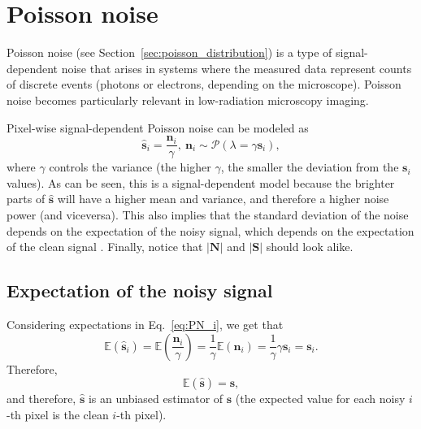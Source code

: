 
\section{Poisson noise}

Poisson noise (see Section~\ref{sec:poisson_distribution}) is a type
of signal-dependent noise that arises in systems where the measured
data represent counts of discrete events (photons or electrons,
depending on the microscope). Poisson noise becomes particularly
relevant in low-radiation microscopy imaging.

Pixel-wise signal-dependent Poisson noise can be modeled as
\begin{equation}
  \hat{\mathbf{s}}_i = \frac{\mathbf{n}_i}{\gamma},~\mathbf{n}_i\sim\mathcal{P}(\lambda=\gamma\mathbf{s}_i),
  \label{eq:PN_i}
\end{equation}
where $\gamma$ controls the variance (the higher $\gamma$, the smaller
the deviation from the $\mathbf{s}_i$ values). As can be seen, this is
a signal-dependent model because the brighter parts of
$\hat{\mathbf s}$ will have a higher mean and variance, and therefore
a higher noise power \cite{meiniel2018denoising} (and viceversa). This also implies
that the standard deviation of the noise depends on the expectation of
the noisy signal, which depends on the expectation of the clean signal
\cite{foi2008practical}. Finally, notice that $|\mathbf{N}|$ and
$|\mathbf{S}|$ should look alike.

\subsection{Expectation of the noisy signal}
Considering expectations in Eq.~\ref{eq:PN_i}, we get that
\begin{equation}
  \mathbb{E}(\hat{\mathbf{s}}_i) = \mathbb{E}\left(\frac{\mathbf{n}_i}{\gamma}\right) = \frac{1}{\gamma}\mathbb{E}(\mathbf{n}_i) = \frac{1}{\gamma}\gamma\mathbf{s}_i = \mathbf{s}_i.
  \label{eq:EPNi}
\end{equation}
Therefore,
\begin{equation}
  \mathbb{E}(\hat{\mathbf{s}}) = \mathbf{s},
  \label{eq:E_Poisson}
\end{equation}
and therefore, $\hat{\mathbf{s}}$ is an unbiased estimator of
$\mathbf{s}$ (the expected value for each noisy $i$-th pixel is the
clean $i$-th pixel).

